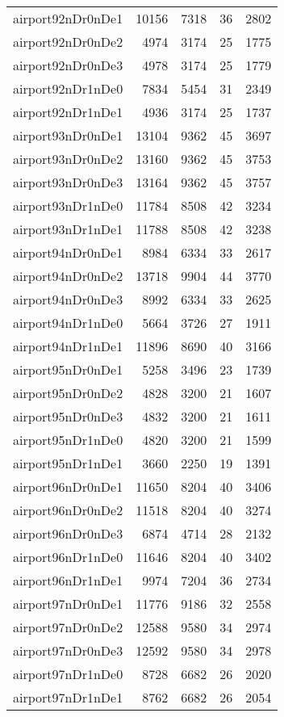 \begin{longtable}{lrrrr}
airport92nDr0nDe1 & 10156 & 7318 & 36 & 2802 \\
airport92nDr0nDe2 & 4974 & 3174 & 25 & 1775 \\
airport92nDr0nDe3 & 4978 & 3174 & 25 & 1779 \\
airport92nDr1nDe0 & 7834 & 5454 & 31 & 2349 \\
airport92nDr1nDe1 & 4936 & 3174 & 25 & 1737 \\
airport93nDr0nDe1 & 13104 & 9362 & 45 & 3697 \\
airport93nDr0nDe2 & 13160 & 9362 & 45 & 3753 \\
airport93nDr0nDe3 & 13164 & 9362 & 45 & 3757 \\
airport93nDr1nDe0 & 11784 & 8508 & 42 & 3234 \\
airport93nDr1nDe1 & 11788 & 8508 & 42 & 3238 \\
airport94nDr0nDe1 & 8984 & 6334 & 33 & 2617 \\
airport94nDr0nDe2 & 13718 & 9904 & 44 & 3770 \\
airport94nDr0nDe3 & 8992 & 6334 & 33 & 2625 \\
airport94nDr1nDe0 & 5664 & 3726 & 27 & 1911 \\
airport94nDr1nDe1 & 11896 & 8690 & 40 & 3166 \\
airport95nDr0nDe1 & 5258 & 3496 & 23 & 1739 \\
airport95nDr0nDe2 & 4828 & 3200 & 21 & 1607 \\
airport95nDr0nDe3 & 4832 & 3200 & 21 & 1611 \\
airport95nDr1nDe0 & 4820 & 3200 & 21 & 1599 \\
airport95nDr1nDe1 & 3660 & 2250 & 19 & 1391 \\
airport96nDr0nDe1 & 11650 & 8204 & 40 & 3406 \\
airport96nDr0nDe2 & 11518 & 8204 & 40 & 3274 \\
airport96nDr0nDe3 & 6874 & 4714 & 28 & 2132 \\
airport96nDr1nDe0 & 11646 & 8204 & 40 & 3402 \\
airport96nDr1nDe1 & 9974 & 7204 & 36 & 2734 \\
airport97nDr0nDe1 & 11776 & 9186 & 32 & 2558 \\
airport97nDr0nDe2 & 12588 & 9580 & 34 & 2974 \\
airport97nDr0nDe3 & 12592 & 9580 & 34 & 2978 \\
airport97nDr1nDe0 & 8728 & 6682 & 26 & 2020 \\
airport97nDr1nDe1 & 8762 & 6682 & 26 & 2054 \\

\end{longtable}
